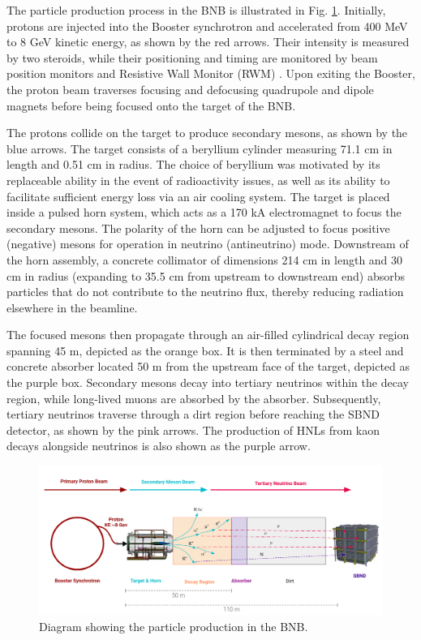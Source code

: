 The particle production process in the BNB is illustrated in Fig. \ref{fig:BNBDiagram}.
Initially, protons are injected into the Booster synchrotron and accelerated from 400 MeV to 8 GeV kinetic energy, as shown by the red arrows. 
Their intensity is measured by two steroids, while their positioning and timing are monitored by beam position monitors and Resistive Wall Monitor (RWM) \cite{BNBRWM}.
Upon exiting the Booster, the proton beam traverses focusing and defocusing quadrupole and dipole magnets before being focused onto the target of the BNB.

The protons collide on the target to produce secondary mesons, as shown by the blue arrows.
The target consists of a beryllium cylinder measuring 71.1 cm in length and 0.51 cm in radius.
The choice of beryllium was motivated by its replaceable ability in the event of radioactivity issues, as well as its ability to facilitate sufficient energy loss via an air cooling system.
The target is placed inside a pulsed horn system, which acts as a 170 kA electromagnet to focus the secondary mesons.
The polarity of the horn can be adjusted to focus positive (negative) mesons for operation in neutrino (antineutrino) mode. 
Downstream of the horn assembly, a concrete collimator of dimensions 214 cm in length and 30 cm in radius (expanding to 35.5 cm from upstream to downstream end) absorbs particles that do not contribute to the neutrino flux, thereby reducing radiation elsewhere in the beamline.

The focused mesons then propagate through an air-filled cylindrical decay region spanning 45 m, depicted as the orange box.
It is then terminated by a steel and concrete absorber located 50 m from the upstream face of the target, depicted as the purple box.
Secondary mesons decay into tertiary neutrinos within the decay region, while long-lived muons are absorbed by the absorber. 
Subsequently, tertiary neutrinos traverse through a dirt region before reaching the SBND detector, as shown by the pink arrows.
The production of HNLs from kaon decays alongside neutrinos is also shown as the purple arrow.

\begin{figure}[tbp] 
\centering    
\includegraphics[width=1.0\textwidth]{BNBDiagram}
\caption[Particle Production in the BNB Diagram]{
Diagram showing the particle production in the BNB.
}
\label{fig:BNBDiagram}
\end{figure}

